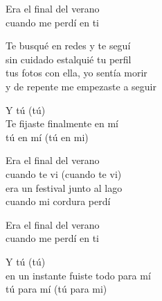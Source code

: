 \begin{lyrics}
Era el final del verano\\
cuando me perdí en ti

Te busqué en redes y te seguí\\
sin cuidado estalquié tu perfil\\
tus fotos con ella, yo sentía morir\\
y de repente me empezaste a seguir

Y tú (tú)\\
Te fijaste finalmente en mí\\
tú en mí (tú en mi)

Era el final del verano\\
cuando te vi (cuando te vi)\\
era un festival junto al lago\\
cuando mi cordura perdí

Era el final del verano\\
cuando me perdí en ti

Y tú (tú)\\
en un instante fuiste todo para mí\\
tú para mí (tú para mi)
\end{lyrics}

